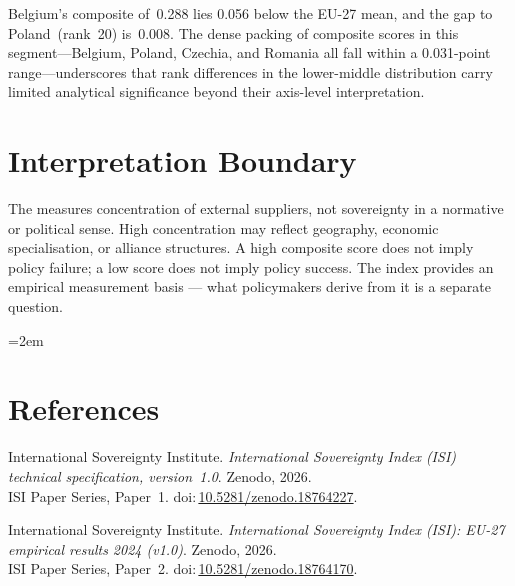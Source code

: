 \documentclass[12pt,a4paper]{article}
\begin{document}
Belgium's composite of~0.288 lies 0.056 below the EU-27 mean, and the gap to Poland~(rank~20) is~0.008.  The dense packing of composite scores in this segment---Belgium, Poland, Czechia, and Romania all fall within a 0.031-point range---underscores that rank differences in the lower-middle distribution carry limited analytical significance beyond their axis-level interpretation.


\section{Interpretation Boundary}
\label{sec:interpretation}

The \ISI measures concentration of external suppliers, not sovereignty in a normative or political sense.  High concentration may reflect geography, economic specialisation, or alliance structures.  A high composite score does not imply policy failure; a low score does not imply policy success.  The index provides an empirical measurement basis --- what policymakers derive from it is a separate question.


\clearpage
\vspace*{1.5cm}

\begingroup\emergencystretch=2em
\section*{References}

\begin{enumerate}[label={[\arabic*]},leftmargin=2em,itemsep=6pt]
\item International Sovereignty Institute.
  \textit{International Sovereignty Index (ISI) technical specification, version~1.0}.
  Zenodo, 2026.\\ISI Paper Series, Paper~1.
  doi:\,\href{https://doi.org/10.5281/zenodo.18764227}{10.5281/zenodo.18764227}.

\item International Sovereignty Institute.
  \textit{International Sovereignty Index (ISI): EU-27 empirical results 2024 (v1.0)}.
  Zenodo, 2026.\\ISI Paper Series, Paper~2.
  doi:\,\href{https://doi.org/10.5281/zenodo.18764170}{10.5281/zenodo.18764170}.
\end{enumerate}
\endgroup
\end{document}
